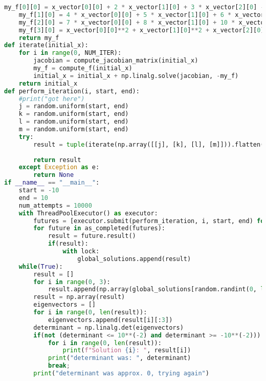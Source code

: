 \documentclass{article}
\begin{document}
\begin{enumerate}[label=\alph*.)]
\begin{lstlisting}[language=Python]
    my_f[0][0] = x_vector[0][0] + 2 * x_vector[1][0] + 3 * x_vector[2][0] - x_vector[3][0] * x_vector[0][0]
    my_f[1][0] = 4 * x_vector[0][0] + 5 * x_vector[1][0] + 6 * x_vector[2][0] - x_vector[3][0] * x_vector[1][0]
    my_f[2][0] = 7 * x_vector[0][0] + 8 * x_vector[1][0] + 10 * x_vector[2][0] - x_vector[3][0] * x_vector[2][0]
    my_f[3][0] = x_vector[0][0]**2 + x_vector[1][0]**2 + x_vector[2][0]**2 - 1
    return my_f
def iterate(initial_x):
    for i in range(0, NUM_ITER):
        jacobian = compute_jacobian_matrix(initial_x)
        my_f = compute_f(initial_x)
        initial_x = initial_x + np.linalg.solve(jacobian, -my_f)
    return initial_x
def perform_iteration(i, start, end):
    #print("got here")
    j = random.uniform(start, end)
    k = random.uniform(start, end)
    l = random.uniform(start, end)
    m = random.uniform(start, end)
    try:
        result = tuple(iterate(np.array([[j], [k], [l], [m]])).flatten())
        
        return result
    except Exception as e:
        return None
if __name__ == "__main__":
    start = -10
    end = 10
    num_attempts = 10000
    with ThreadPoolExecutor() as executor:
        futures = [executor.submit(perform_iteration, i, start, end) for i in range(num_attempts)]
        for future in as_completed(futures):
            result = future.result()
            if(result):
                with lock:
                    global_solutions.append(result)
    while(True):
        result = []
        for i in range(0, 3):
            result.append(np.array(global_solutions[random.randint(0, len(global_solutions))]))
        result = np.array(result)
        eigenvectors = []
        for i in range(0, len(result)):
            eigenvectors.append(result[i][:3])
        determinant = np.linalg.det(eigenvectors)
        if(not (determinant <= 10**(-2) and determinant >= -10**(-2))):
            for i in range(0, len(result)):
                print(f"Solution {i}: ", result[i]) 
            print("determinant was: ", determinant)
            break;
        print("determinant was approx. 0, trying again")
\end{lstlisting}
\end{enumerate}
\end{document}
